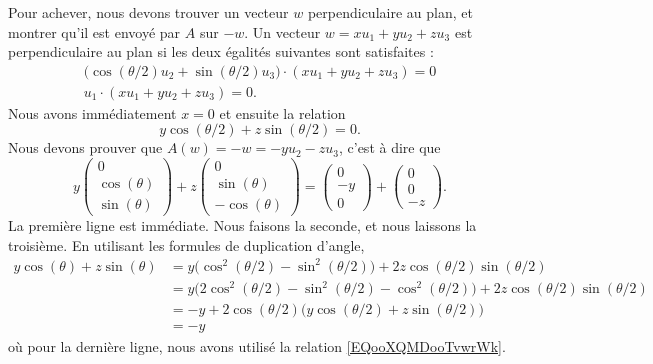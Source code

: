 \begin{subproof}
	Pour achever, nous devons trouver un vecteur \( w\) perpendiculaire au plan, et montrer qu'il est envoyé par \( A\) sur \( -w\). Un vecteur \( w=xu_1+yu_2+zu_3\) est perpendiculaire au plan si les deux égalités suivantes sont satisfaites :
	\begin{subequations}
		\begin{align}
			\big( \cos(\theta/2)u_2+\sin(\theta/2)u_3 \big)\cdot (xu_1+yu_2+zu_3)=0 \\
			u_1\cdot(xu_1+yu_2+zu_3)=0.
		\end{align}
	\end{subequations}
	Nous avons immédiatement \( x=0\) et ensuite la relation
	\begin{equation}        \label{EQooXQMDooTvwrWk}
		y\cos(\theta/2)+z\sin(\theta/2)=0.
	\end{equation}
	Nous devons prouver que \( A(w)=-w=-yu_2-zu_3\), c'est à dire que
	\begin{equation}
		y\begin{pmatrix}
			0            \\
			\cos(\theta) \\
			\sin(\theta)
		\end{pmatrix}
		+z\begin{pmatrix}
			0            \\
			\sin(\theta) \\
			-\cos(\theta)
		\end{pmatrix}
		=\begin{pmatrix}
			0  \\
			-y \\
			0
		\end{pmatrix}+\begin{pmatrix}
			0 \\
			0 \\
			-z
		\end{pmatrix}.
	\end{equation}
	La première ligne est immédiate. Nous faisons la seconde, et nous laissons  la troisième. En utilisant les formules de duplication d'angle,
	\begin{subequations}
		\begin{align}
			y\cos(\theta)+z\sin(\theta) & =y\big( \cos^2(\theta/2)-\sin^2(\theta/2) \big)+2z\cos(\theta/2)\sin(\theta/2)                   \\
			                            & =y\big( 2\cos^2(\theta/2)-\sin^2(\theta/2)-\cos^2(\theta/2) \big)+2z\cos(\theta/2)\sin(\theta/2) \\
			                            & =-y+2\cos(\theta/2)\big( y\cos(\theta/2)+z\sin(\theta/2) \big)                                   \\
			                            & =-y
		\end{align}
	\end{subequations}
	où pour la dernière ligne, nous avons utilisé la relation \eqref{EQooXQMDooTvwrWk}.


\end{subproof}
